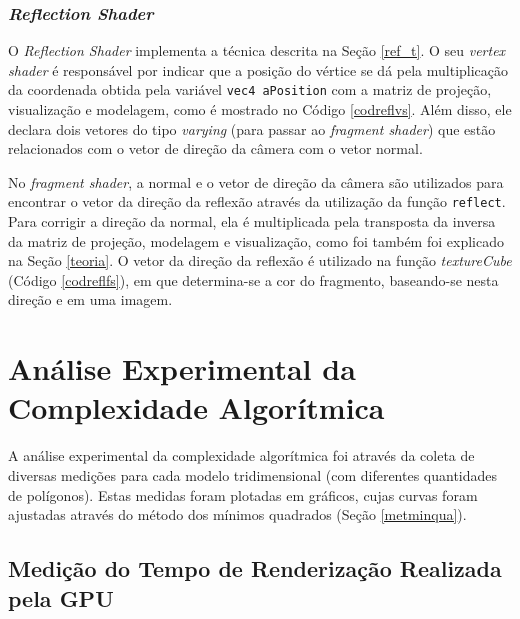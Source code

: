 	
	
\subsubsection{\textit{Reflection Shader}}

	O \textit{Reflection Shader} implementa a técnica descrita na Seção \ref{ref_t}. O seu \textit{vertex shader} é responsável por indicar que a posição do vértice se dá pela multiplicação da coordenada obtida pela variável \texttt{vec4 aPosition} com a matriz de projeção, visualização e modelagem, como é mostrado no Código \ref{codreflvs}. Além disso, ele declara dois vetores do tipo \textit{varying} (para passar ao \textit{fragment shader}) que estão relacionados com o vetor de direção da câmera com o vetor normal. 

	

	No \textit{fragment shader}, a normal e o vetor de direção da câmera são utilizados para encontrar o vetor da direção da reflexão através da utilização da função \texttt{reflect}. Para corrigir a direção da normal, ela é multiplicada pela transposta da inversa da matriz de projeção, modelagem e visualização, como foi também foi explicado na Seção \ref{teoria}. O vetor da direção da reflexão é utilizado na função \textit{textureCube} (Código \ref{codreflfs}), em que determina-se a cor do fragmento, baseando-se nesta direção e em uma imagem. 

	

\section{Análise Experimental da Complexidade Algorítmica}

	A análise experimental da complexidade algorítmica foi através da coleta de diversas medições para cada modelo tridimensional (com diferentes quantidades de polígonos). Estas medidas foram plotadas em gráficos, cujas curvas foram ajustadas através do método dos mínimos quadrados (Seção \ref{metminqua}). 

\subsection{Medição do Tempo de Renderização Realizada pela GPU}
\label{gpu}

